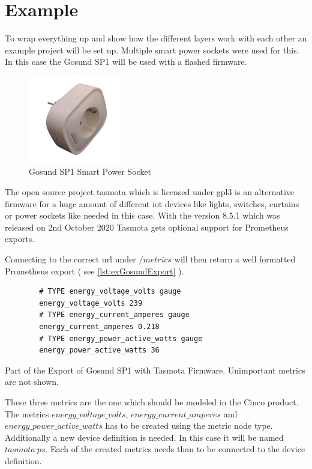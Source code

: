 \section{Example}
To wrap everything up and show how the different layers work with each other an example project will be set up. Multiple smart power sockets were used for this. In this case the Gosund SP1 will be used with a flashed firmware.
\begin{figure}[H]
	\centering
	\includegraphics[width=4cm]{assets/images/gosund.png}
	\caption{Gosund SP1 Smart Power Socket}
\end{figure}
The open source project tasmota \cite{tasmotawebsite} which is licensed under \gls{gpl3} is an alternative firmware for a huge amount of different \gls{iot} devices like lights, switches, curtains or power sockets like needed in this case.
With the version 8.5.1 which was released on 2nd October 2020 Tasmota gets optional support for Prometheus exports. 

Connecting to the correct \gls{url} under $/metrics$ will then return a well formatted Prometheus export ( see \ref{lst:exGosundExport} ).

\begin{listing}[H]
	\begin{verbatim}
		# TYPE energy_voltage_volts gauge
		energy_voltage_volts 239
		# TYPE energy_current_amperes gauge
		energy_current_amperes 0.218
		# TYPE energy_power_active_watts gauge
		energy_power_active_watts 36
	\end{verbatim}
	\caption{Part of the Export of Gosund SP1 with Tasmota Firmware. Unimportant metrics are not shown.}
	\label{lst:exGosundExport}
\end{listing}

These three metrics are the one which should be modeled in the Cinco product. The metrics $energy\_voltage\_volts$, $energy\_current\_amperes$ and $energy\_power\_active\_watts$ has to be created using the metric node type. Additionally a new device definition is needed. In this case it will be named $tasmota\ ps$. Each of the created metrics needs than to be connected to the device definition.

